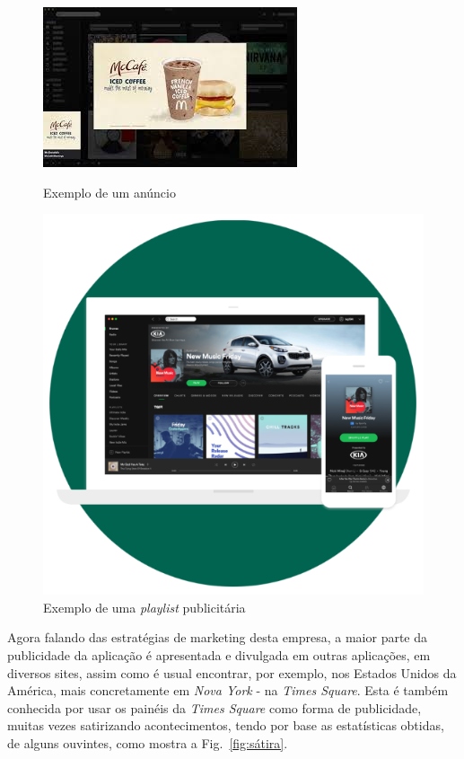\documentclass{report}
\begin{document}
\begin{figure}
    \centering
    \begin{minipage}[b]{0.4\textwidth}
   \includegraphics[scale = 0.5]{Imagens/admccafe.jpg}
    \caption{Exemplo de um anúncio} \label{fig:ad}
    \end{minipage}
    \hfill
    \centering
    \begin{minipage}[b]{0.4\textwidth}
    \includegraphics[scale = 0.2]{Imagens/playlistad.PNG}
    \caption{Exemplo de uma \textit{playlist} publicitária} \label{fig:playlist}
    \end{minipage}
\end{figure}
%

Agora falando das estratégias de marketing desta empresa, a maior parte da publicidade da aplicação é apresentada e divulgada em outras aplicações, em diversos sites, assim como é usual encontrar, por exemplo, nos Estados Unidos da América, mais concretamente em \textit{Nova York} - na \textit{Times Square}. Esta é também conhecida por usar os painéis da \textit{Times Square} como forma de publicidade, muitas vezes satirizando acontecimentos, tendo por base as estatísticas obtidas, de alguns ouvintes, como mostra a Fig.~\ref{fig:sátira}.
\end{document}
